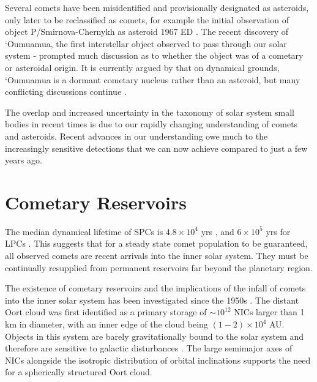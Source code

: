 Several comets have been misidentified and provisionally designated as asteroids, only later to be reclassified as comets, for example the initial observation of object P/Smirnova-Chernykh as asteroid 1967 ED \cite{Rickman1985}. The recent discovery of `Oumuamua, the first interstellar object observed to pass through our solar system - prompted much discussion as to whether the object was of a cometary or asteroidal origin. It is currently argued by \cite{2017arXiv171109599R} that on dynamical grounds, `Oumuamua is a dormant cometary nucleus rather than an asteroid, but many conflicting discussions continue \cite{2017arXiv171107535F, meech2017brief}. %

The overlap and increased uncertainty in the taxonomy of solar system small bodies in recent times is due to our rapidly changing understanding of comets and asteroids. Recent advances in our understanding owe much to the increasingly sensitive detections that we can now achieve compared to just a few years ago.



\vspace{-2ex}
\section{Cometary Reservoirs}
\label{sec:origin_of_comets}

The median dynamical lifetime of SPCs is $4.8\times10^4$ yrs \cite{1991AJ....102..787L}, and $6\times10^5$ yrs for LPCs \cite{1979IAUS...81..277W}. This suggests that for a steady state comet population to be guaranteed, all observed comets are recent arrivals into the inner solar system. They must be continually resupplied from permanent reservoirs far beyond the planetary region.

The existence of cometary reservoirs and the implications of the infall of comets into the inner solar system has been investigated since the 1950s \cite{1950BAN....11...91O, 1951PNAS...37....1K}. The distant Oort cloud was first identified as a primary storage of $\sim10^{12}$ NICs larger than 1 km in diameter, with an inner edge of the cloud being $(1-2)\times10^4$ AU. Objects in this system are barely gravitationally bound to the solar system and therefore are sensitive to galactic disturbances \cite{1981AJ.....86.1730H}. The large semimajor axes of NICs alongside the isotropic distribution of orbital inclinations supports the need for a spherically structured Oort cloud.


